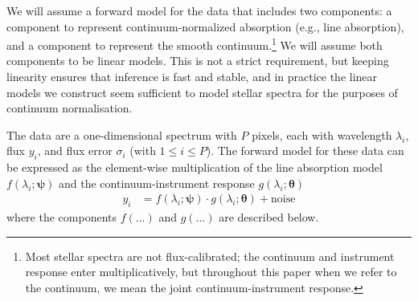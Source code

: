 \documentclass[modern]{aastex631}
\newcommand{\vectheta}{\boldsymbol{\theta}}
\newcommand{\vecpsi}{\boldsymbol{\psi}}
\begin{document}
We will assume a forward model for the data that includes two components: a component to represent continuum-normalized absorption (e.g., line absorption), and a component to represent the smooth continuum.\footnote{Most stellar spectra are not flux-calibrated; the continuum and instrument response enter multiplicatively, but throughout this paper when we refer to the continuum, we mean the joint continuum-instrument response.}
We will assume both components to be linear models. This is not a strict requirement, but keeping linearity ensures that  inference is fast and stable, and in practice the linear models we construct seem sufficient to model stellar spectra for the purposes of continuum normalisation.



The data are a one-dimensional spectrum with $P$ pixels, each with wavelength $\lambda_i$, flux $y_i$, and flux error $\sigma_i$ (with $1 \leq i \leq P$). The forward model for these data can be expressed as the element-wise multiplication of the line absorption model $f(\lambda_i; \vecpsi)$ and the continuum-instrument response $g(\lambda_i;\vectheta)$
\begin{align}
    y_i &= f(\lambda_i;\vecpsi)\cdot{}g(\lambda_i;\vectheta) + \mbox{noise}
\end{align}
where the components $f(...)$ and $g(...)$ are described below.
\end{document}
